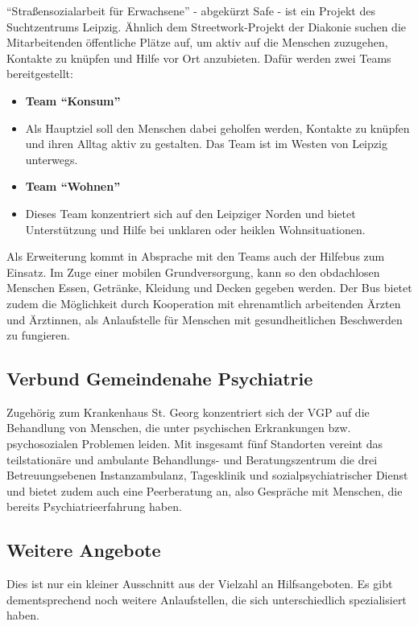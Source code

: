 \enquote{Straßensozialarbeit für Erwachsene} - abgekürzt \acs{Safe} - ist ein Projekt des Suchtzentrums Leipzig. Ähnlich dem Streetwork-Projekt der Diakonie suchen die Mitarbeitenden öffentliche Plätze auf, um aktiv auf die Menschen zuzugehen, Kontakte zu knüpfen und Hilfe vor Ort anzubieten. Dafür werden zwei Teams bereitgestellt:

\begin{itemize}
	\item \textbf{Team \enquote{Konsum}}
	\item[] Als Hauptziel soll den Menschen dabei geholfen werden, Kontakte zu knüpfen und ihren Alltag aktiv zu gestalten. Das Team ist im Westen von Leipzig unterwegs.
	\item \textbf{Team \enquote{Wohnen}}
	\item[] Dieses Team konzentriert sich auf den Leipziger Norden und bietet Unterstützung und Hilfe bei unklaren oder heiklen Wohnsituationen.
\end{itemize}

Als Erweiterung kommt in Absprache mit den Teams auch der Hilfebus zum Einsatz. Im Zuge einer mobilen Grundversorgung, kann so den obdachlosen Menschen Essen, Getränke, Kleidung und Decken gegeben werden. Der Bus bietet zudem die Möglichkeit durch Kooperation mit ehrenamtlich arbeitenden Ärzten und Ärztinnen, als Anlaufstelle für Menschen mit gesundheitlichen Beschwerden zu fungieren. \citep{Safe}

\subsection{Verbund Gemeindenahe Psychiatrie}

Zugehörig zum Krankenhaus St. Georg konzentriert sich der \ac{VGP} auf die Behandlung von Menschen, die unter psychischen Erkrankungen bzw. psychosozialen Problemen leiden. Mit insgesamt fünf Standorten vereint das teilstationäre und ambulante Behandlungs- und Beratungszentrum die drei Betreuungsebenen Instanzambulanz, Tagesklinik und sozialpsychiatrischer Dienst und bietet zudem auch eine Peerberatung an, also Gespräche mit Menschen, die bereits Psychiatrieerfahrung haben. \citep{VGP}

\subsection{Weitere Angebote}

Dies ist nur ein kleiner Ausschnitt aus der Vielzahl an Hilfsangeboten. Es gibt dementsprechend noch weitere Anlaufstellen, die sich unterschiedlich spezialisiert haben.

